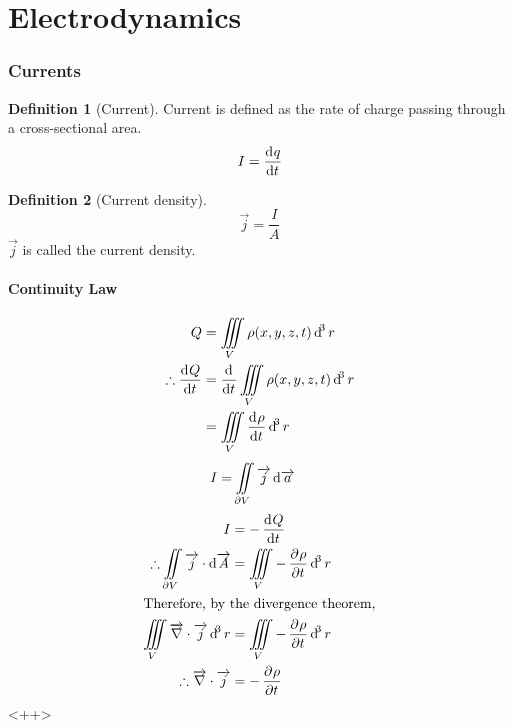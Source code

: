 \documentclass[fleqn, a4paper, 12pt, twoside]{article}
\theoremstyle{definition}
\newtheorem{definition}{Definition}
\theoremstyle{theorem}
\begin{document}
\part{Electrodynamics}

\section{Currents}

\begin{definition}[Current]
	Current is defined as the rate of charge passing through a cross-sectional area.
	\begin{equation*}
		I = \dod{q}{t}
	\end{equation*}
\end{definition}

\begin{definition}[Current density]
	\begin{equation*}
		\overrightarrow{j} = \dfrac{I}{A}
	\end{equation*}
	$\overrightarrow{j}$ is called the current density.
\end{definition}

\subsection{Continuity Law}

\begin{align*}
	Q                     & = \iiint\limits_{V} \rho(x,y,z,t) \dif^3 r           \\
	\therefore \dod{Q}{t} & = \dod{}{t} \iiint\limits_{V} \rho(x,y,z,t) \dif^3 r \\
                              & = \iiint\limits_{V} \dod{\rho}{t} \dif^3 r
\end{align*}
\begin{align*}
	I & = \iint\limits_{\partial V} \overrightarrow{j} \dif \overrightarrow{a}
\end{align*}
\begin{align*}
	I                                                                                     & = - \dod{Q}{t}                              \\
	\therefore \iint\limits_{\partial V} \overrightarrow{j} \cdot \dif \overrightarrow{A} & = \iiint\limits_{V} -\dpd{\rho}{t} \dif^3 r \\
	\intertext{Therefore, by the divergence theorem,}
	\iiint\limits_{V} \overrightarrow{\nabla} \cdot \overrightarrow{j} \dif^3 r           & = \iiint\limits_{V} -\dpd{\rho}{t} \dif^3 r \\
	\therefore \overrightarrow{\nabla} \cdot \overrightarrow{j}                           & = -\dpd{\rho}{t}
\end{align*}<++>
\end{document}
